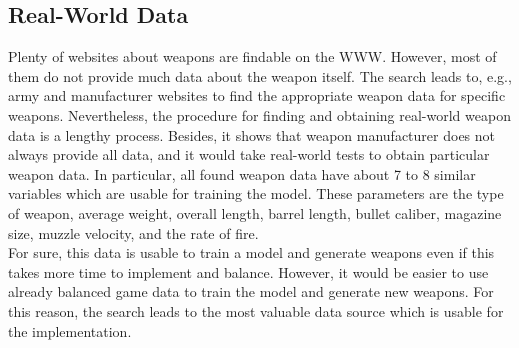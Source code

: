 \documentclass[MGS,Master,english]{twbook}%
\begin{document}
\subsection{Real-World Data}
Plenty of websites about weapons are findable on the \ac{WWW}. However, most of them do not provide much data about the weapon itself. The search leads to, e.g., army and manufacturer websites to find the appropriate weapon data for specific weapons. Nevertheless, the procedure for finding and obtaining real-world weapon data is a lengthy process. Besides, it shows that weapon manufacturer does not always provide all data, and it would take real-world tests to obtain particular weapon data. In particular, all found weapon data have about 7 to 8 similar variables which are usable for training the model. These parameters are the type of weapon, average weight, overall length, barrel length, bullet caliber, magazine size, muzzle velocity, and the rate of fire.\\
For sure, this data is usable to train a model and generate weapons even if this takes more time to implement and balance. However, it would be easier to use already balanced game data to train the model and generate new weapons. For this reason, the search leads to the most valuable data source which is usable for the implementation.
\end{document}
